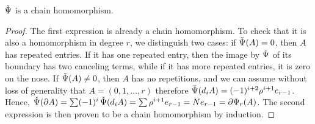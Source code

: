 \begin{lemma}
	$\operatorname{\check{\Psi}}$ is a chain homomorphism. %
\end{lemma}
\begin{proof}
The first expression is already a chain homomorphism. To check that it is also a homomorphism in degree $r$, we distinguish two cases: if $\operatorname{\check{\Psi}}(A) = 0$, then $A$ has repeated entries. If it has one repeated entry, then the image by $\operatorname{\check{\Psi}}$ of its boundary has two canceling terms, while if it has more repeated entries, it is zero on the nose. If $\operatorname{\check{\Psi}}(A)\neq 0$, then $A$ has no repetitions, and we can assume without loss of generality that $A=(0,1,\ldots,r)$ therefore $\operatorname{\check{\Psi}}(d_iA) = (-1)^{i+2}\rho^{i+1} e_{r-1}$. Hence, $\operatorname{\check{\Psi}}(\partial A) = \sum (-1)^i\operatorname{\check{\Psi}}(d_iA) = \sum \rho^{i+1} e_{r-1} = Ne_{r-1} = \partial \Psi_r(A)$. The second expression is then proven to be a chain homomorphism by induction. 
\end{proof}

